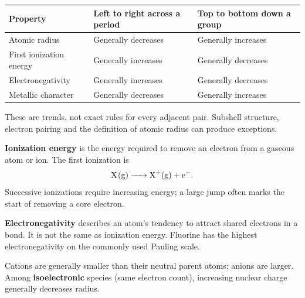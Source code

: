 \documentclass[a4paper,10pt]{article}
\begin{document}
\begin{tabularx}{\linewidth}{@{}P{41mm}LL@{}}
\toprule
Property & Left to right across a period & Top to bottom down a group \\
\midrule
Atomic radius & Generally decreases & Generally increases \\
First ionization energy & Generally increases & Generally decreases \\
Electronegativity & Generally increases & Generally decreases \\
Metallic character & Generally decreases & Generally increases \\
\bottomrule
\end{tabularx}

These are trends, not exact rules for every adjacent pair. Subshell structure,
electron pairing and the definition of atomic radius can produce exceptions.

\textbf{Ionization energy} is the energy required to remove an electron from a
gaseous atom or ion. The first ionization is
\[
 \ce{X(g) -> X+(g) + e-}.
\]
Successive ionizations require increasing energy; a large jump often marks
the start of removing a core electron.

\textbf{Electronegativity} describes an atom's tendency to attract shared
electrons in a bond. It is not the same as ionization energy. Fluorine has the
highest electronegativity on the commonly used Pauling scale.

Cations are generally smaller than their neutral parent atoms; anions are
larger. Among \textbf{isoelectronic} species (same electron count), increasing
nuclear charge generally decreases radius.
\end{document}
